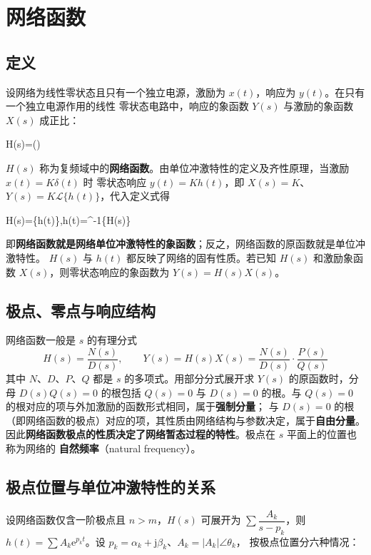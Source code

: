 \section{网络函数}

\subsection{定义}
设网络为线性零状态且只有一个独立电源，激励为 $x(t)$，响应为 $y(t)$。在只有一个独立电源作用的线性
零状态电路中，响应的象函数 $Y(s)$ 与激励的象函数 $X(s)$ 成正比：
\begin{keyformula}{H(s)=\qquad()}
\end{keyformula}
$H(s)$ 称为复频域中的\textbf{网络函数}。由单位冲激特性的定义及齐性原理，当激励 $x(t)=K\delta(t)$ 时
零状态响应 $y(t)=Kh(t)$，即 $X(s)=K$、$Y(s)=K\mathcal{L}\{h(t)\}$，代入定义式得
\begin{keyformula}{H(s)=\{h(t)\},\qquad h(t)=^{-1}\{H(s)\}}
\end{keyformula}
即\textbf{网络函数就是网络单位冲激特性的象函数}；反之，网络函数的原函数就是单位冲激特性。
$H(s)$ 与 $h(t)$ 都反映了网络的固有性质。若已知 $H(s)$ 和激励象函数 $X(s)$，则零状态响应的象函数为
$Y(s)=H(s)X(s)$。

\subsection{极点、零点与响应结构}
网络函数一般是 $s$ 的有理分式
\begin{equation}
  H(s)=\frac{N(s)}{D(s)},\qquad
  Y(s)=H(s)X(s)=\frac{N(s)}{D(s)}\cdot\frac{P(s)}{Q(s)}
\end{equation}
其中 $N$、$D$、$P$、$Q$ 都是 $s$ 的多项式。用部分分式展开求 $Y(s)$ 的原函数时，分母 $D(s)Q(s)=0$
的根包括 $Q(s)=0$ 与 $D(s)=0$ 的根。与 $Q(s)=0$ 的根对应的项与外加激励的函数形式相同，属于\textbf{强制分量}；
与 $D(s)=0$ 的根（即网络函数的极点）对应的项，其性质由网络结构与参数决定，属于\textbf{自由分量}。
因此\textbf{网络函数极点的性质决定了网络暂态过程的特性}。极点在 $s$ 平面上的位置也称为网络的
\textbf{自然频率}（natural frequency）。

\subsection{极点位置与单位冲激特性的关系}
设网络函数仅含一阶极点且 $n>m$，$H(s)$ 可展开为 $\sum\dfrac{A_k}{s-p_k}$，则
$h(t)=\sum A_k\mathrm{e}^{p_kt}$。设 $p_k=\alpha_k+\mathrm{j}\beta_k$、$A_k=|A_k|\angle\theta_k$，
按极点位置分六种情况：

